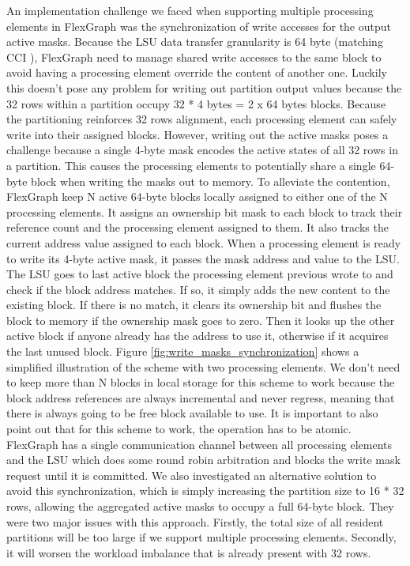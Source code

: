 An implementation challenge we faced when supporting multiple processing elements in FlexGraph was the synchronization of write accesses for the output active masks. Because the LSU data transfer granularity is 64 byte (matching CCI \cite{CCI}), FlexGraph need to manage shared write accesses to the same block to avoid having a processing element override the content of another one. Luckily this doesn't pose any problem for writing out partition output values because the 32 rows within a partition occupy 32 * 4 bytes = 2 x 64 bytes blocks. Because the partitioning reinforces 32 rows alignment, each processing element can safely write into their assigned blocks. However, writing out the active masks poses a challenge because a single 4-byte mask encodes the active states of all 32 rows in a partition. This causes the processing elements to potentially share a single 64-byte block when writing the masks out to memory. To alleviate the contention, FlexGraph keep N active 64-byte blocks locally assigned to either one of the N processing elements. It assigns an ownership bit mask to each block to track their reference count and the processing element assigned to them. It also tracks the current address value assigned to each block. When a processing element is ready to write its 4-byte active mask, it passes the mask address and value to the LSU. The LSU goes to last active block the processing element previous wrote to and check if the block address matches. If so, it simply adds the new content to the existing block. If there is no match, it clears its ownership bit and flushes the block to memory if the ownership mask goes to zero. Then it looks up the other active block if anyone already has the address to use it, otherwise if it acquires the last unused block. Figure \ref{fig:write_masks_synchronization} shows a simplified illustration of the scheme with two processing elements. We don't need to keep more than N blocks in local storage for this scheme to work because the block address references are always incremental and never regress, meaning that there is always going to be free block available to use. It is important to also point out that for this scheme to work, the operation has to be atomic. FlexGraph has a single communication channel between all processing elements and the LSU which does some round robin arbitration and blocks the write mask request until it is committed. We also investigated an alternative solution to avoid this synchronization, which is simply increasing the partition size to 16 * 32 rows, allowing the aggregated active masks to occupy a full 64-byte block. They were two major issues with this approach. Firstly, the total size of all resident partitions will be too large if we support multiple processing elements. Secondly, it will worsen the workload imbalance that is already present with 32 rows.     

